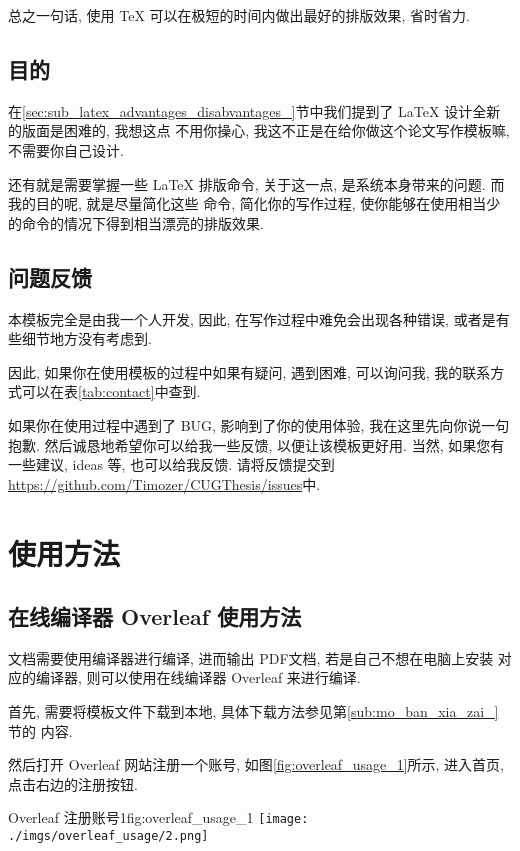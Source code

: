 \documentclass[bibsec, doctor, tabtoc, figtoc]{cugthesis}
\begin{document}
总之一句话, 使用 \TeX{} 可以在极短的时间内做出最好的排版效果, 省时省力.

\section{目的}
\label{sec:mu_di_}
在\ref{sec:sub_latex_advantages_disabvantages_}节中我们提到了 \LaTeX{} 设计全新的版面是困难的, 我想这点
不用你操心, 我这不正是在给你做这个论文写作模板嘛, 不需要你自己设计.

还有就是需要掌握一些 \LaTeX{} 排版命令, 关于这一点, 是系统本身带来的问题. 而我的目的呢, 就是尽量简化这些
命令, 简化你的写作过程, 使你能够在使用相当少的命令的情况下得到相当漂亮的排版效果.

\section{问题反馈}
\label{sec:wen_ti_fan_kui_}
本模板完全是由我一个人开发, 因此, 在写作过程中难免会出现各种错误, 或者是有些细节地方没有考虑到.

因此, 如果你在使用模板的过程中如果有疑问, 遇到困难, 可以询问我, 我的联系方式可以在表\ref{tab:contact}中查到.

如果你在使用过程中遇到了 BUG, 影响到了你的使用体验, 我在这里先向你说一句抱歉.
然后诚恳地希望你可以给我一些反馈, 以便让该模板更好用. 当然, 如果您有一些建议, ideas 等, 也可以给我反馈.
请将反馈提交到
\url{https://github.com/Timozer/CUGThesis/issues}中.


\chapter{使用方法}

\section{在线编译器 Overleaf 使用方法}
\label{sec:overleaf_usage}

\LaTeXe{} 文档需要使用编译器进行编译, 进而输出 PDF文档, 若是自己不想在电脑上安装
对应的编译器, 则可以使用在线编译器 Overleaf 来进行编译.

首先, 需要将模板文件下载到本地, 具体下载方法参见第\ref{sub:mo_ban_xia_zai_} 节的
内容.

然后打开 Overleaf 网站注册一个账号, 如图\ref{fig:overleaf_usage_1}所示,
进入首页, 点击右边的注册按钮.

\begin{tfig}{Overleaf 注册账号1}{fig:overleaf_usage_1}
\texttt{[image: ./imgs/overleaf\_usage/2.png]}
\end{tfig}
\end{document}
